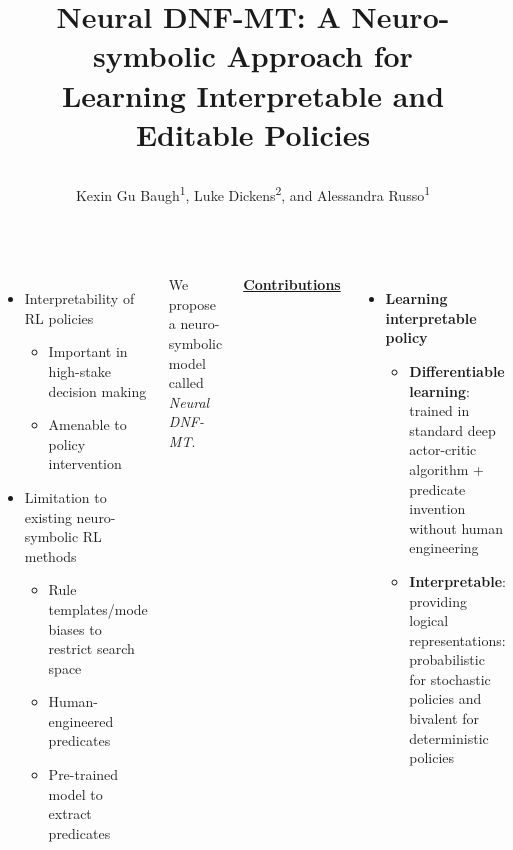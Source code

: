 \documentclass{tikzposter} %
\title{\parbox{\linewidth}{\centering\sffamily\bfseries Neural DNF-MT: A
Neuro-symbolic Approach for\\Learning Interpretable and Editable Policies}}
\institute{\sffamily
\textsuperscript{1}Imperial College London~
\textsuperscript{2}University College London
}
\author{\sffamily
Kexin Gu Baugh\textsuperscript{1}, %
Luke Dickens\textsuperscript{2}, %
and Alessandra Russo\textsuperscript{1}
}
\begin{document}
\maketitle

\begin{columns}


     {
        \begin{itemize}
            \item Interpretability of RL policies
                  \begin{itemize}
                      \item Important in high-stake decision making
                      \item Amenable to policy intervention
                  \end{itemize}

            \item Limitation to existing neuro-symbolic RL methods
                  \begin{itemize}
                      \item Rule templates/mode biases to restrict search space
                      \item Human-engineered predicates
                      \item Pre-trained model to extract predicates
                  \end{itemize}
        \end{itemize}
    }

     {

        We propose a neuro-symbolic model called
        \emph{\color{ImperialBlue}Neural DNF-MT}.

        \vspace{1em}

        {\color{ImperialBlue}\underline{\sffamily\textbf{Contributions}}}

        \begin{itemize}
            \item \textbf{Learning interpretable policy}
                  \begin{itemize}
                      \item \textbf{Differentiable learning}: trained in
                            standard deep actor-critic algorithm + predicate
                            invention without human engineering
                      \item \textbf{Interpretable}: providing logical
                            representations: probabilistic for stochastic
                            policies and bivalent for deterministic policies
                  \end{itemize}


\end{itemize}}
\end{columns}
\end{document}
